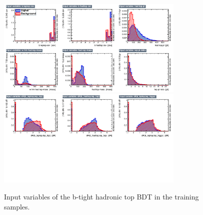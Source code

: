 
\begin{figure}[hbtp]
 \begin{center}
   \includegraphics[width=0.8\textwidth]{ch9_figs/recoBdt_btight/variables_id_c1.pdf}
   \includegraphics[width=0.8\textwidth]{ch9_figs/recoBdt_btight/variables_id_c2.pdf}
   \caption[Input variables of the b-tight hadronic top BDT]{Input variables of the b-tight hadronic top BDT in the training samples.}
   \label{fig:recoBdt_btight_inputs}
 \end{center}
\end{figure}

